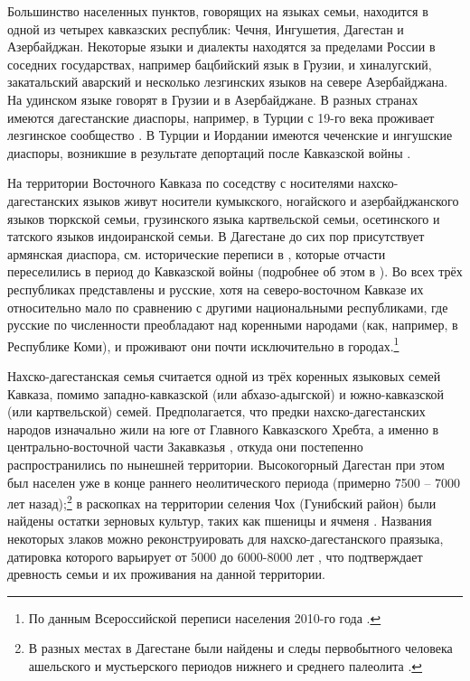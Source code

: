 Большинство населенных пунктов, говорящих на языках семьи, находится в одной из четырех кавказских республик: Чечня, Ингушетия, Дагестан и Азербайджан. Некоторые языки и диалекты находятся за пределами России в соседних государствах, например бацбийский язык в Грузии, и хиналугский, закатальский аварский и несколько лезгинских языков на севере Азербайджана. На удинском языке говорят в Грузии и в Азербайджане. В разных странах имеются дагестанские диаспоры, например, в Турции с 19-го века проживает лезгинское сообщество \citep{moor1985}. В Турции и Иордании имеются чеченские и ингушские диаспоры, возникшие в результате депортаций после Кавказской войны \citep[4]{nichols2011}.
\par На территории Восточного Кавказа по соседству с носителями нахско-дагестанских языков живут носители кумыкского, ногайского и азербайджанского языков тюркской семьи, грузинского языка картвельской семьи, осетинского и татского языков индоиранской семьи. В Дагестане до сих пор присутствует армянская диаспора, см. исторические переписи в \citep{multidag}, которые отчасти переселились в период до Кавказской войны (подробнее об этом в \citep{magomedkhanovmusaeva2015}). Во всех трёх республиках представлены и русские, хотя на северо-восточном Кавказе их относительно мало по сравнению с другими национальными республиками, где русские по численности преобладают над коренными народами (как, например, в Республике Коми), и проживают они почти исключительно в городах.\footnote{По данным Всероссийской переписи населения 2010-го года \citep{vpn2010}.}
\par Нахско-дагестанская семья считается одной из трёх коренных языковых семей Кавказа, помимо западно-кавказской (или абхазо-адыгской) и южно-кавказской (или картвельской) семей. Предполагается, что предки нахско-дагестанских народов изначально жили на юге от Главного Кавказского Хребта, а именно в центрально-восточной части Закавказья \citep[317]{schulze2013}, откуда они постепенно распространились по нынешней территории. Высокогорный Дагестан при этом был населен уже в конце раннего неолитического периода (примерно 7500 -- 7000 лет назад);\footnote{В разных местах в Дагестане были найдены и следы первобытного человека ашельского и мустьерского периодов нижнего и среднего палеолита \citep[12--13]{ataevetal1967}.} в раскопках на территории селения Чох (Гунибский район) были найдены остатки зерновых культур, таких как пшеницы и ячменя \citep{amirkhanov1987}. Названия некоторых злаков можно реконструировать для нахско-дагестанского праязыка, датировка которого варьирует от 5000 \citep[21]{koryakov2006} до 6000-8000 лет \citep{nicholsrange}, что подтверждает древность семьи и их проживания на данной территории.
